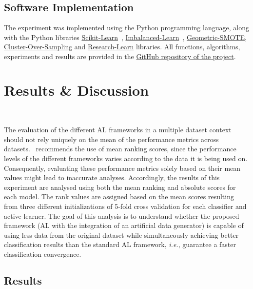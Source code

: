 \subsection{Software Implementation}

The experiment was implemented using the Python programming language, along
with the Python libraries
\href{https://scikit-learn.org/stable/}{Scikit-Learn}~\cite{Pedregosa2011},
\href{https://imbalanced-learn.org/en/stable/}{Imbalanced-Learn}~\cite{JMLR:v18:16-365},
\href{https://geometric-smote.readthedocs.io/en/latest/?badge=latest}{Geometric-SMOTE},
\href{https://cluster-over-sampling.readthedocs.io/en/latest/?badge=latest}{Cluster-Over-Sampling}
and
\href{https://research-learn.readthedocs.io/en/latest/?badge=latest}{Research-Learn}
libraries. All functions, algorithms, experiments and results are provided in
the \href{https://github.com/joaopfonseca/publications/}{GitHub repository of the
project}.

\section{Results \& Discussion}~\label{sec:results-al-generator}

The evaluation of the different AL frameworks in a multiple dataset context
should not rely uniquely on the mean of the performance metrics across
datasets.~\cite{Demsar2006} recommends the use of mean ranking scores, since
the performance levels of the different frameworks varies according to the
data it is being used on. Consequently, evaluating these performance metrics
solely based on their mean values might lead to inaccurate analyses.
Accordingly, the results of this experiment are analysed using both the mean
ranking and absolute scores for each model. The rank values are assigned based
on the mean scores resulting from three different initializations of 5-fold
cross validation for each classifier and active learner. The goal of this
analysis is to understand whether the proposed framework (AL with the
integration of an artificial data generator) is capable of using less data
from the original dataset while simultaneously achieving better classification
results than the standard AL framework, \textit{i.e.}, guarantee a faster
classification convergence. 

\subsection{Results}~\label{sec:sub_results-al-generator}

